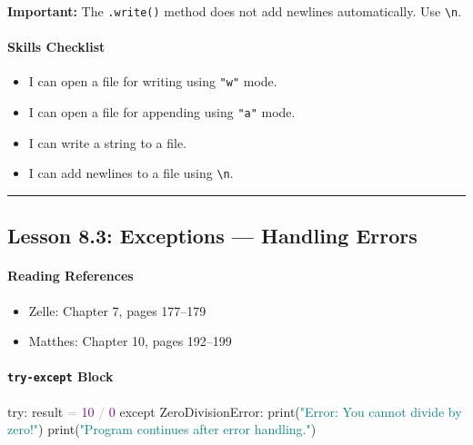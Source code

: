 \documentclass[
  justified,
  openright,
]{tufte-book}
\let\subsubsection\paragraph
\let\paragraph\paragraph
\newcommand{\BuiltInTok}[1]{#1}
\newcommand{\ControlFlowTok}[1]{\textcolor{BrandBlue}{#1}}
\newcommand{\DecValTok}[1]{\textcolor{Purple}{#1}}
\newcommand{\NormalTok}[1]{#1}
\newcommand{\OperatorTok}[1]{\textcolor{DarkGray}{#1}}
\newcommand{\PreprocessorTok}[1]{\textcolor{BrandAccent}{#1}}
\newcommand{\StringTok}[1]{\textcolor{Teal}{#1}}
\newenvironment{Shaded}{%
  \begin{snugshade}
}{%
  \end{snugshade}
}
\let\subsubsection\paragraph
\let\paragraph\paragraph
\providecommand{\tightlist}{%
  \setlength{\itemsep}{0pt}\setlength{\parskip}{0pt}}
\begin{document}
\textbf{Important:} The \texttt{.write()} method does not add newlines
automatically. Use \texttt{\textbackslash{}n}.

\subsubsection{Skills Checklist}\label{skills-checklist-38}

\begin{itemize}
\tightlist
\item[$\square$]
  I can open a file for writing using \texttt{"w"} mode.
\item[$\square$]
  I can open a file for appending using \texttt{"a"} mode.
\item[$\square$]
  I can write a string to a file.
\item[$\square$]
  I can add newlines to a file using \texttt{\textbackslash{}n}.
\end{itemize}

\begin{center}\rule{0.5\linewidth}{0.5pt}\end{center}

\subsection{Lesson 8.3: Exceptions --- Handling
Errors}\label{lesson-8.3-exceptions-handling-errors}

\subsubsection{Reading References}\label{reading-references-25}

\begin{itemize}
\tightlist
\item
  Zelle: Chapter 7, pages 177--179
\item
  Matthes: Chapter 10, pages 192--199
\end{itemize}

\subsubsection{\texorpdfstring{\texttt{try-except}
Block}{try-except Block}}\label{try-except-block}

\begin{Shaded}
\begin{Highlighting}[]
\ControlFlowTok{try}\NormalTok{:}
\NormalTok{    result }\OperatorTok{=} \DecValTok{10} \OperatorTok{/} \DecValTok{0}
\ControlFlowTok{except} \PreprocessorTok{ZeroDivisionError}\NormalTok{:}
    \BuiltInTok{print}\NormalTok{(}\StringTok{"Error: You cannot divide by zero!"}\NormalTok{)}
\BuiltInTok{print}\NormalTok{(}\StringTok{"Program continues after error handling."}\NormalTok{)}
\end{Highlighting}
\end{Shaded}
\end{document}
